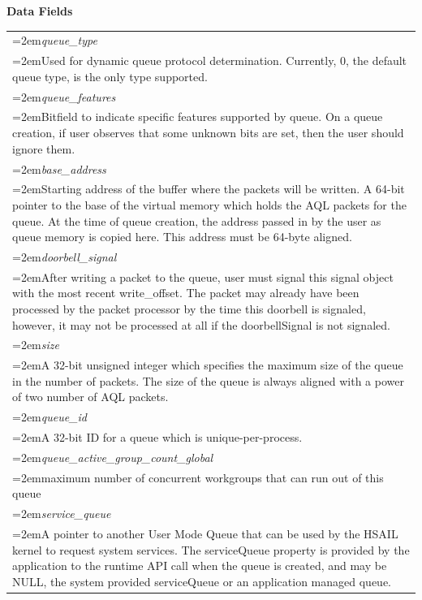 \documentclass{book}
\newcommand{\hsaarg}[1]{\textit{#1}}
\begin{document}
\noindent\textbf{Data Fields}\\[-5mm]
\begin{longtable}{@{}>{\hangindent=2em}p{\textwidth}}
\hsaarg{queue\_type}\\\hspace{2em}Used for dynamic queue protocol determination. Currently, 0, the default queue type, is the only type supported.\\[2mm]
\hsaarg{queue\_features}\\\hspace{2em}Bitfield to indicate specific features supported by queue. On a queue creation, if user observes that some unknown bits are set, then the user should ignore them.\\[2mm]
\hsaarg{base\_address}\\\hspace{2em}Starting address of the buffer where the packets will be written. A 64-bit pointer to the base of the virtual memory which holds the AQL packets for the queue. At the time of queue creation, the address passed in by the user as queue memory is copied here. This address must be 64-byte aligned.\\[2mm]
\hsaarg{doorbell\_signal}\\\hspace{2em}After writing a packet to the queue, user must signal this signal object with the most recent write\_offset. The packet may already have been processed by the packet processor by the time this doorbell is signaled, however, it may not be processed at all if the doorbellSignal is not signaled.\\[2mm]
\hsaarg{size}\\\hspace{2em}A 32-bit unsigned integer which specifies the maximum size of the queue in the number of packets. The size of the queue is always aligned with a power of two number of AQL packets.\\[2mm]
\hsaarg{queue\_id}\\\hspace{2em}A 32-bit ID for a queue which is unique-per-process.\\[2mm]
\hsaarg{queue\_active\_group\_count\_global}\\\hspace{2em}maximum number of concurrent workgroups that can run out of this queue\\[2mm]
\hsaarg{service\_queue}\\\hspace{2em}A pointer to another User Mode Queue that can be used by the HSAIL kernel to request system services. The serviceQueue property is provided by the application to the runtime API call when the queue is created, and may be NULL, the system provided serviceQueue or an application managed queue.
\end{longtable}
\end{document}
